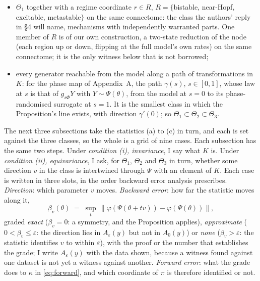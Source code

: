 \documentclass[11pt]{article}
\begin{document}
\begin{enumerate}
\begin{itemize}
  \item[$\Theta_2$] $\Theta_1$ together with a regime coordinate $r\in R$, $R=\{$bistable, near-Hopf, excitable, metastable$\}$ on the same connectome: the class the authors' reply in \S4 will name, mechanisms with independently warranted parts. One member of $R$ is of our own construction, a two-state reduction of the node (each region up or down, flipping at the full model's own rates) on the same connectome; it is the only witness below that is not borrowed;
  \item[$\Theta_3$] every generator reachable from the model along a path of transformations in $K$: for the phase map of Appendix~A, the path $\gamma(s)$, $s\in[0,1]$, whose law at $s$ is that of $g_{s\Phi}Y$ with $Y\sim\Psi(\theta)$, from the model at $s=0$ to its phase-randomised surrogate at $s=1$. It is the smallest class in which the Proposition's line exists, with direction $\gamma'(0)$; so $\Theta_1\subset\Theta_2\subset\Theta_3$.
  \end{itemize}
\end{enumerate}
The next three subsections take the statistics (a) to (c) in turn, and each is set against the three classes, so the whole is a grid of nine cases. Each subsection has the same two steps. Under \emph{condition (i), invariance}, I say what $K$ is. Under \emph{condition (ii), equivariance}, I ask, for $\Theta_1$, $\Theta_2$ and $\Theta_3$ in turn, whether some direction $v$ in the class is intertwined through $\Psi$ with an element of $K$. Each case is written in three slots, in the order backward error analysis prescribes. \emph{Direction}: which parameter $v$ moves. \emph{Backward error}: how far the statistic moves along it,
\begin{equation}
\beta_v(\theta)\;=\;\sup_{t}\,\bigl\|\varphi(\Psi(\theta+tv))-\varphi(\Psi(\theta))\bigr\|,
\label{eq:betav}
\end{equation}
graded \emph{exact} ($\beta_v=0$: a symmetry, and the Proposition applies), \emph{approximate} ($0<\beta_v\le\varepsilon$: the direction lies in $A_\varepsilon(y)$ but not in $A_0(y)$) or \emph{none} ($\beta_v>\varepsilon$: the statistic identifies $v$ to within $\varepsilon$), with the proof or the number that establishes the grade; I write $A_\varepsilon(y)$ with the data shown, because a witness found against one dataset is not yet a witness against another. \emph{Forward error}: what the grade does to $\kappa$ in \eqref{eq:forward}, and which coordinate of $\pi$ is therefore identified or not.
\end{document}
